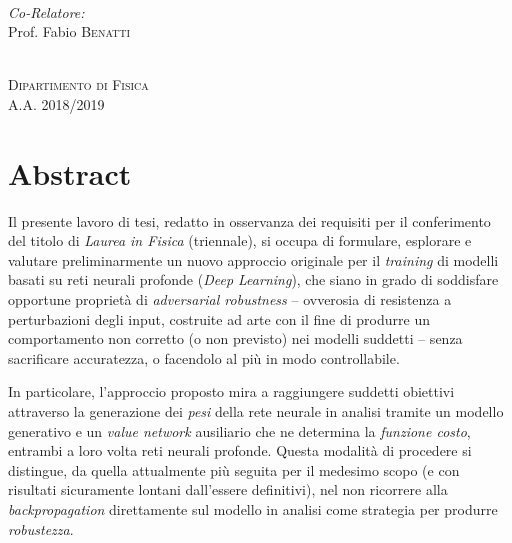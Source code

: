 \documentclass[a4paper, twoside]{article}
\begin{document}
\begin{titlepage}
\begin{minipage}{0.4\textwidth}
\begin{flushleft}
\emph{{\\ Co-Relatore:}} \\
{Prof. Fabio}  \textsc{{Benatti}}
\end{flushleft}
\end{minipage}\\[2cm]


\Large
\textsc{Dipartimento di Fisica\\
A.A. 2018/2019}
\vfill %
\end{titlepage}


\newcommand{\blankpage}{
	\newpage
	\thispagestyle{empty}
	\mbox{}
	\newpage}

\blankpage
\newpage
\renewcommand{\contentsname}{Indice}  %
\setcounter{section}{-1}			  %
\tableofcontents


\newpage
\section{Abstract}

Il presente lavoro di tesi, redatto in osservanza dei requisiti per il conferimento del titolo di \textit{Laurea in Fisica} (triennale), si occupa di formulare, esplorare e valutare preliminarmente un nuovo approccio originale per il \textit{training} di modelli basati su reti neurali profonde (\textit{Deep Learning}), che siano in grado di soddisfare opportune proprietà di \textit{adversarial robustness} -- ovverosia di resistenza a perturbazioni degli input, costruite ad arte con il fine di produrre un comportamento non corretto (o non previsto) nei modelli suddetti -- senza sacrificare accuratezza, o facendolo al più in modo controllabile.

In particolare, l'approccio proposto mira a raggiungere suddetti obiettivi attraverso la generazione dei \textit{pesi} della rete neurale in analisi tramite un modello generativo e un \textit{value network} ausiliario che ne determina la \textit{funzione costo}, entrambi a loro volta reti neurali profonde. Questa modalità di procedere si distingue, da quella attualmente più seguita per il medesimo scopo (e con risultati sicuramente lontani dall'essere definitivi), nel non ricorrere alla \textit{backpropagation} direttamente sul modello in analisi come strategia per produrre \textit{robustezza}.
\end{document}
